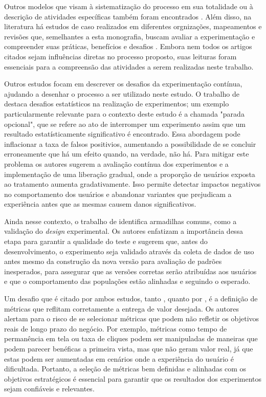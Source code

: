 Outros modelos que visam à sistematização do processo em sua totalidade ou à descrição de atividades específicas também foram encontrados \cite{fagerholm_right_2017, issa_mattos_hurrier_2023, olsson_opinions_2014}. Além disso, na literatura há estudos de caso realizados em diferentes orgnizações, mapeamentos e revisões que, semelhantes a esta monografia, buscam avaliar a experimentação e compreender suas práticas, benefícios e desafios \cite{kevic_characterizing_2017, kuhrmann_activity_2018, fernandes_hitting_2015, sauvola_towards_2015, issa_mattos_hurrier_2023, kohavi_online_2013, fabijan_benefits_2017, quin_b_2024, erthal_characterization_2023, larsen_statistical_2024}. Embora nem todos os artigos citados sejam influências diretas no processo proposto, suas leituras foram essenciais para a compreensão das atividades a serem realizadas neste trabalho.

Outros estudos focam em descrever os desafios da experimentação contínua, ajudando a desenhar o processo a ser utilizado neste estudo. O trabalho de  destaca desafios estatísticos na realização de experimentos; um exemplo particularmente relevante para o contexto deste estudo é a chamada "parada opcional", que se refere ao ato de interromper um experimento assim que um resultado estatísticamente significativo é encontrado. Essa abordagem pode inflacionar a taxa de falsos positivios, aumentando a possibilidade de se concluir erroneamente que há um efeito quando, na verdade, não há. Para mitigar este problema os autores sugerem a avaliação contínua dos experimentos e a implementação de uma liberação gradual, onde a proporção de usuários exposta ao tratamento aumenta gradativamente. Isso permite detectar impactos negativos no comportamento dos usuários e abandonar variantes que prejudicam a experiência antes que as mesmas causem danos significativos.

Ainda nesse contexto, o trabalho de  identifica armadilhas comuns, como a validação do \textit{design} experimental. Os autores enfatizam a importância dessa etapa para garantir a qualidade do teste e sugerem que, antes do desenvolvimento, o experimento seja validado através da coleta de dados de uso antes mesmo da construção da nova versão para avaliação de padrões inesperados, para assegurar que as versões corretas serão atribuídas aos usuários e que o comportamento das populações estão alinhadas e seguindo o esperado.

Um desafio que é citado por ambos estudos, tanto , quanto por , é a definição de métricas que reflitam corretamente a entrega de valor desejada. Os autores alertam para o risco de se selecionar métricas que podem não refletir os objetivos reais de longo prazo do negócio. Por exemplo, métricas como tempo de permanência em tela ou taxa de cliques podem ser manipuladas de maneiras que podem parecer benéficas a primeira vista, mas que não geram valor real, já que estas podem ser aumentadas em cenários onde a experiência do usuário é dificultada. Portanto, a seleção de métricas bem definidas e alinhadas com os objetivos estratégicos é essencial para garantir que os resultados dos experimentos sejam confiáveis e relevantes.

